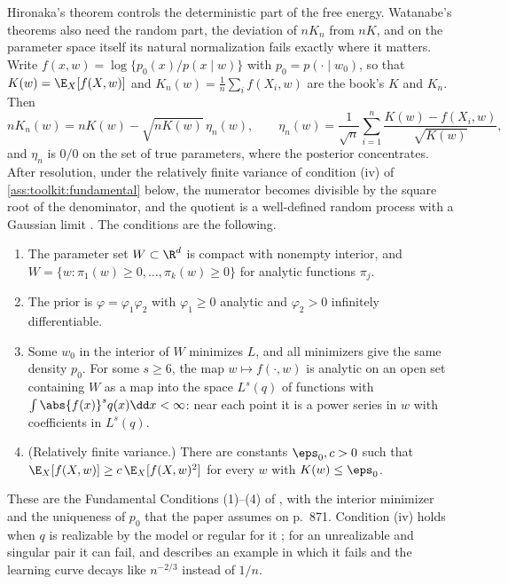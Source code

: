 \begin{refsection}
Hironaka's theorem controls the deterministic part of the free energy. Watanabe's theorems also need the random part, the deviation of $nK_n$ from $nK$, and on the parameter space itself its natural normalization fails exactly where it matters. Write $f(x,w)=\log\{p_0(x)/p(x\mid w)\}$ with $p_0=p(\cdot\mid w_0)$, so that $K(w)=\E_X[f(X,w)]$ and $K_n(w)=\frac1n\sum_if(X_i,w)$ are the book's $K$ and $K_n$. Then
\[
nK_n(w)=nK(w)-\sqrt{nK(w)}\,\eta_n(w),\qquad\eta_n(w)=\frac1{\sqrt n}\sum_{i=1}^n\frac{K(w)-f(X_i,w)}{\sqrt{K(w)}},
\]
and $\eta_n$ is $0/0$ on the set of true parameters, where the posterior concentrates. After resolution, under the relatively finite variance of condition (iv) of \cref{ass:toolkit:fundamental} below, the numerator becomes divisible by the square root of the denominator, and the quotient is a well-defined random process with a Gaussian limit \parencite[Section~4.2]{Watanabe2024}. The conditions are the following.

\begin{assumption}\label{ass:toolkit:fundamental}
\leavevmode
\begin{enumerate}
\item The parameter set $W\subset\R^d$ is compact with nonempty interior, and $W=\{w:\pi_1(w)\ge0,\dots,\pi_k(w)\ge0\}$ for analytic functions $\pi_j$.
\item The prior is $\varphi=\varphi_1\varphi_2$ with $\varphi_1\ge0$ analytic and $\varphi_2>0$ infinitely differentiable.
\item Some $w_0$ in the interior of $W$ minimizes $L$, and all minimizers give the same density $p_0$. For some $s\ge6$, the map $w\mapsto f(\cdot,w)$ is analytic on an open set containing $W$ as a map into the space $L^s(q)$ of functions with $\int\abs{f(x)}^sq(x)\dd x<\infty$: near each point it is a power series in $w$ with coefficients in $L^s(q)$.
\item (Relatively finite variance.) There are constants $\eps_0,c>0$ such that $\E_X[f(X,w)]\ge c\,\E_X[f(X,w)^2]$ for every $w$ with $K(w)\le\eps_0$.
\end{enumerate}
\end{assumption}

These are the Fundamental Conditions (1)--(4) of \textcite[p.~872]{Watanabe2013}, with the interior minimizer and the uniqueness of $p_0$ that the paper assumes on p.~871. Condition (iv) holds when $q$ is realizable by the model or regular for it \parencite[p.~872]{Watanabe2013}; for an unrealizable and singular pair it can fail, and \textcite{Watanabe2010d} describes an example in which it fails and the learning curve decays like $n^{-2/3}$ instead of $1/n$.


\end{refsection}
